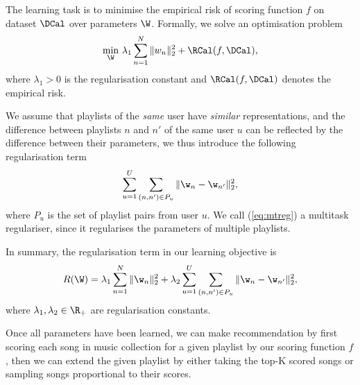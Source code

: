 The learning task is to minimise the empirical risk of scoring function $f$ on dataset $\DCal$ over parameters $\W$.
Formally, we solve an optimisation problem
\begin{equation}
\label{eq:obj}
\min_{\W} \, \lambda_1 \sum_{n=1}^N \| w_n \|_2^2 + \RCal(f, \DCal),
\end{equation}
where $\lambda_1 > 0$ is the regularisation constant and $\RCal(f, \DCal)$ denotes the empirical risk.

We assume that playlists of the \emph{same} user have \emph{similar} representations,
and the difference between playlists $n$ and $n'$ of the same user $u$ can be reflected by the difference 
between their parameters, we thus introduce the following regularisation term 
\begin{equation}
\label{eq:mtreg}
\sum_{u=1}^U \sum_{(n, n') \in P_u} \| \w_n - \w_{n'} \|_2^2,
\end{equation}
where $P_u$ is the set of playlist pairs from user $u$.
We call (\ref{eq:mtreg}) a multitask regulariser, since it regularises the parameters of multiple playlists.

In summary, the regularisation term in our learning objective is
\begin{equation}
\label{eq:reg}
R(\W) = \lambda_1 \sum_{n=1}^N \| \w_n \|_2^2 + \lambda_2 \sum_{u=1}^U \sum_{(n, n') \in P_u} \| \w_n - \w_{n'} \|_2^2,
\end{equation}
where $\lambda_1, \lambda_2 \in \R_+$ are regularisation constants.

Once all parameters have been learned, we can make recommendation by first scoring each song in music collection
for a given playlist by our scoring function $f$, 
then we can extend the given playlist by either taking the top-K scored songs or sampling songs proportional to their scores.
